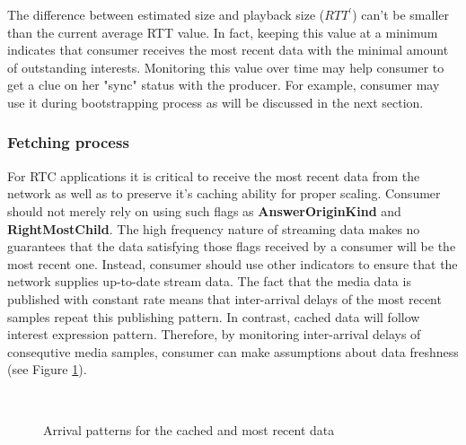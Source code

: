 \documentclass[10pt]{proc}
\begin{document}
The difference between estimated size and playback size ($RTT^{\prime}$) can't be smaller than the current average RTT value. In fact, keeping this value at a minimum indicates that consumer receives the most recent data with the minimal amount of outstanding interests. Monitoring this value over time may help consumer to get a clue on her "sync" status with the producer. For example, consumer may use it during bootstrapping process as will be discussed in the next section. 

\subsubsection{Fetching process}

For RTC applications it is critical to receive the most recent data from the network as well as to preserve it's caching ability for proper scaling. Consumer should not merely rely on using such flags as \textbf{AnswerOriginKind} and \textbf{RightMostChild}. The high frequency nature of streaming data makes no guarantees that the data satisfying those flags received by a consumer will be the most recent one. Instead, consumer should use other indicators to ensure that the network supplies up-to-date stream data. The fact that the media data is published with constant rate means that inter-arrival delays of the most recent samples repeat this publishing pattern. In contrast, cached data will follow interest expression pattern. Therefore, by monitoring inter-arrival delays of consequtive media samples, consumer can make assumptions about data freshness (see Figure \ref{fig:inter-arrival}).

\begin{figure}[Ht!]
\centering

\\

\caption{Arrival patterns for the cached and most recent data}
\label{fig:inter-arrival}
\end{figure}
\end{document}
